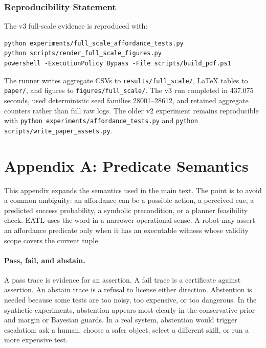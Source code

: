 \documentclass{article}
\begin{document}
\subsubsection*{Reproducibility Statement}
The v3 full-scale evidence is reproduced with:
\begin{verbatim}
python experiments/full_scale_affordance_tests.py
python scripts/render_full_scale_figures.py
powershell -ExecutionPolicy Bypass -File scripts/build_pdf.ps1
\end{verbatim}
The runner writes aggregate CSVs to \texttt{results/full\_scale/}, LaTeX tables
to \texttt{paper/}, and figures to \texttt{figures/full\_scale/}.  The v3 run
completed in 437.075 seconds, used deterministic seed families 28001--28612,
and retained aggregate counters rather than full raw logs.  The older v2
experiment remains reproducible with \texttt{python experiments/affordance\_tests.py}
and \texttt{python scripts/write\_paper\_assets.py}.




\appendix

\section{Appendix A: Predicate Semantics}

This appendix expands the semantics used in the main text.  The point is to
avoid a common ambiguity: an affordance can be a possible action, a perceived
cue, a predicted success probability, a symbolic precondition, or a planner
feasibility check.  EATL uses the word in a narrower operational sense.  A robot
may assert an affordance predicate only when it has an executable witness whose
validity scope covers the current tuple.

\paragraph{Pass, fail, and abstain.}
A pass trace is evidence for an assertion.  A fail trace is a certificate
against assertion.  An abstain trace is a refusal to license either direction.
Abstention is needed because some tests are too noisy, too expensive, or too
dangerous.  In the synthetic experiments, abstention appears most clearly in
the conservative prior and margin or Bayesian guards.  In a real system,
abstention would trigger escalation: ask a human, choose a safer object, select
a different skill, or run a more expensive test.
\end{document}
